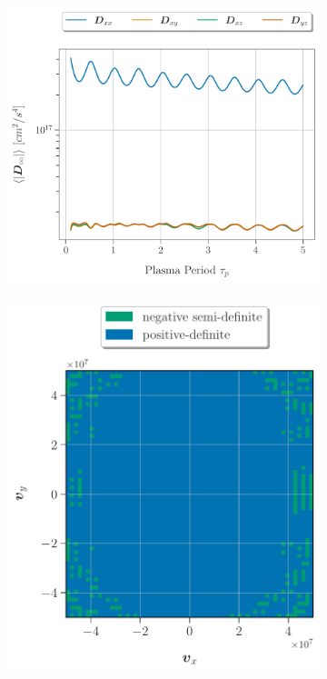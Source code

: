 \begin{figure}
  \begin{subfigure}[b]{0.49\textwidth}
    \includegraphics[width=\textwidth, keepaspectratio, valign=b]{figures/results/D_avg.pdf}
    \caption{}
    \label{fig:Davg_timeevolution}
  \end{subfigure}
  \hspace{2mm}
  \begin{subfigure}[b]{0.42\textwidth}
    \includegraphics[width=\textwidth, keepaspectratio, valign=b]{figures/results/D_cholesky_it0800.pdf}

\end{subfigure}
\end{figure}
